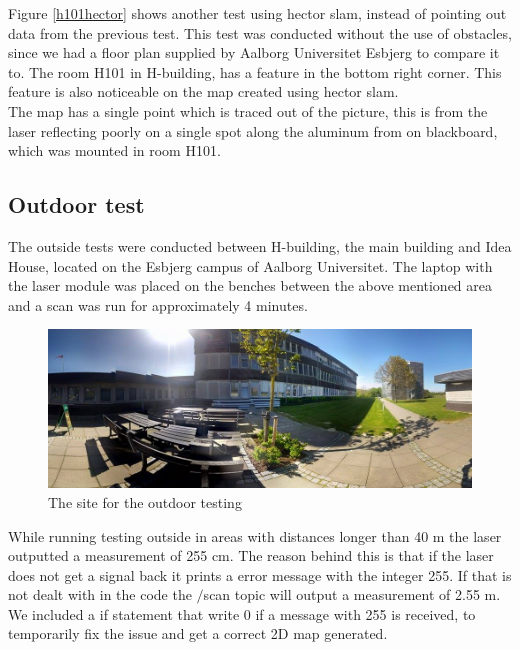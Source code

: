 Figure \ref{h101hector} shows another test using hector slam, instead of pointing out data from the previous test. This test was conducted without the use of obstacles, since we had a floor plan supplied by Aalborg Universitet Esbjerg to compare it to. The room H101 in H-building, has a feature in the bottom right corner. This feature is also noticeable on the map created using hector slam.\\
The map has a single point which is traced out of the picture, this is from the laser reflecting poorly on a single spot along the aluminum from on blackboard, which was mounted in room H101.

\subsection{Outdoor test}
The outside tests were conducted between H-building, the main building and Idea House, located on the Esbjerg campus of Aalborg Universitet. The laptop with the laser module was placed on the benches between the above mentioned area and a scan was run for approximately 4 minutes.

\begin{figure}[H]
	\centering
	\includegraphics[width=1\linewidth]{images/lidar_outside_site.jpg}
	\caption{The site for the outdoor testing}
	\label{outsideslam}
\end{figure}

While running testing outside in areas with distances longer than 40 m the laser outputted a measurement of 255 cm. The reason behind this is that if the laser does not get a signal back it prints a error message with the integer 255. If that is not dealt with in the code the $/$scan topic will output a measurement of 2.55 m. We included a if statement that write 0 if a message with 255 is received, to temporarily fix the issue and get a correct 2D map generated. 


